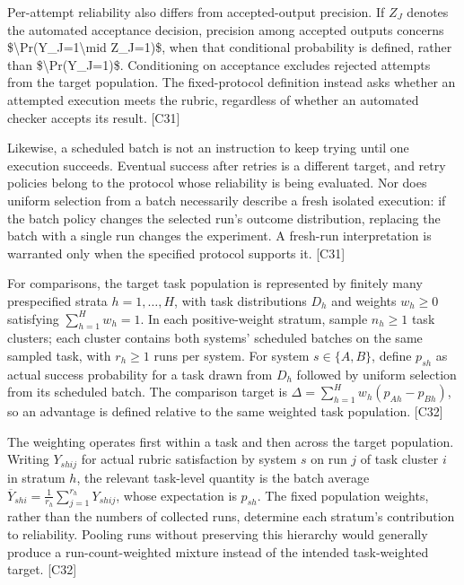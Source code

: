 \documentclass[11pt]{article}
\begin{document}
Per-attempt reliability also differs from accepted-output precision. If $Z_J$ denotes the automated acceptance decision, precision among accepted outputs concerns \$\textbackslash{}Pr(Y\_J=1\textbackslash{}mid Z\_J=1)\$, when that conditional probability is defined, rather than \$\textbackslash{}Pr(Y\_J=1)\$. Conditioning on acceptance excludes rejected attempts from the target population. The fixed-protocol definition instead asks whether an attempted execution meets the rubric, regardless of whether an automated checker accepts its result. [C31]

Likewise, a scheduled batch is not an instruction to keep trying until one execution succeeds. Eventual success after retries is a different target, and retry policies belong to the protocol whose reliability is being evaluated. Nor does uniform selection from a batch necessarily describe a fresh isolated execution: if the batch policy changes the selected run\textquoteright{}s outcome distribution, replacing the batch with a single run changes the experiment. A fresh-run interpretation is warranted only when the specified protocol supports it. [C31]

For comparisons, the target task population is represented by finitely many prespecified strata $h=1,\ldots,H$, with task distributions $D_h$ and weights $w_h\geq 0$ satisfying $\sum_{h=1}^{H}w_h=1$. In each positive-weight stratum, sample $n_h\geq 1$ task clusters; each cluster contains both systems\textquoteright{} scheduled batches on the same sampled task, with $r_h\geq 1$ runs per system. For system $s\in\{A,B\}$, define $p_{sh}$ as actual success probability for a task drawn from $D_h$ followed by uniform selection from its scheduled batch. The comparison target is $\Delta=\sum_{h=1}^{H}w_h(p_{Ah}-p_{Bh})$, so an advantage is defined relative to the same weighted task population. [C32]

The weighting operates first within a task and then across the target population. Writing $Y_{shij}$ for actual rubric satisfaction by system $s$ on run $j$ of task cluster $i$ in stratum $h$, the relevant task-level quantity is the batch average $\overline{Y}_{shi}=\frac{1}{r_h}\sum_{j=1}^{r_h}Y_{shij}$, whose expectation is $p_{sh}$. The fixed population weights, rather than the numbers of collected runs, determine each stratum\textquoteright{}s contribution to reliability. Pooling runs without preserving this hierarchy would generally produce a run-count-weighted mixture instead of the intended task-weighted target. [C32]
\end{document}
